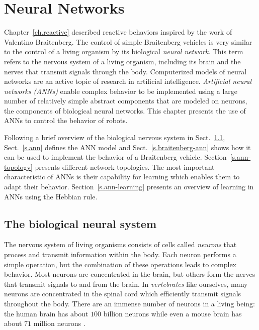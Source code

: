 
\chapter{Neural Networks}\label{ch.neural}

Chapter~\ref{ch.reactive} described reactive behaviors inspired by the work of Valentino Braitenberg. The control of simple Braitenberg vehicles is very similar to the control of a living organism by its biological \emph{neural network}. This term refers to the nervous system of a living organism, including its brain and the nerves that transmit signals through the body. Computerized models of neural networks are an active topic of research in artificial intelligence. \emph{Artificial neural networks (ANNs)} enable complex behavior to be implemented using a large number of relatively simple abstract components that are modeled on neurons, the components of biological neural networks. This chapter presents the use of ANNs to control the behavior of robots.

Following a brief overview of the biological nervous system in Sect.~\ref{s.bio-nn}, Sect.~\ref{s.ann} defines the ANN model and Sect.~\ref{s.braitenberg-ann} shows how it can be used to implement the behavior of a Braitenberg vehicle. Section~\ref{s.ann-topology} presents different network topologies. The most important characteristic of ANNs is their capability for learning which enables them to adapt their behavior. Section~\ref{s.ann-learning} presents an overview of learning in ANNs using the Hebbian rule.

\section{The biological neural system}\label{s.bio-nn}

The nervous system of living organisms consists of cells called \emph{neurons} that process and transmit information within the body. Each neuron performs a simple operation, but the combination of these operations leads to complex behavior. Most neurons are concentrated in the brain, but others form the nerves that transmit signals to and from the brain. In \emph{vertebrates} like ourselves, many neurons are concentrated in the spinal cord which efficiently transmit signals throughout the body. There are an immense number of neurons in a living being: the human brain has about $100$ billion neurons while even a mouse brain has about $71$ million neurons \cite{herculano2009human}. 

